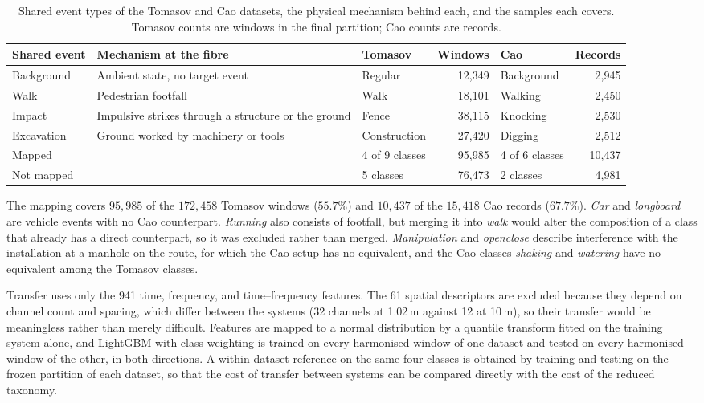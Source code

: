 \begin{table}[!htbp]
	\centering
	\caption{Shared event types of the Tomasov and Cao datasets, the physical mechanism behind each, and the samples each covers. Tomasov counts are windows in the final partition; Cao counts are records.}
	\label{tab:label_mapping}
	\small
	\setlength{\tabcolsep}{4pt}
	\begin{tabularx}{\textwidth}{@{}l >{\raggedright\arraybackslash}X l r l r@{}}
		\toprule
		\textbf{Shared event} & \textbf{Mechanism at the fibre} & \textbf{Tomasov} & \textbf{Windows} & \textbf{Cao} & \textbf{Records}\\
		\midrule
		Background  & Ambient state, no target event & Regular      & 12{,}349 & Background & 2{,}945\\
		Walk        & Pedestrian footfall & Walk         & 18{,}101 & Walking    & 2{,}450\\
		Impact      & Impulsive strikes through a structure or the ground & Fence        & 38{,}115 & Knocking   & 2{,}530\\
		Excavation  & Ground worked by machinery or tools & Construction & 27{,}420 & Digging    & 2{,}512\\
		\midrule
		Mapped      & & 4 of 9 classes & 95{,}985 & 4 of 6 classes & 10{,}437\\
		Not mapped  & & 5 classes      & 76{,}473 & 2 classes      & 4{,}981\\
		\bottomrule
	\end{tabularx}
\end{table}

The mapping covers $95{,}985$ of the $172{,}458$ Tomasov windows ($55.7\%$) and $10{,}437$ of the $15{,}418$ Cao records ($67.7\%$). \emph{Car} and \emph{longboard} are vehicle events with no Cao counterpart. \emph{Running} also consists of footfall, but merging it into \emph{walk} would alter the composition of a class that already has a direct counterpart, so it was excluded rather than merged. \emph{Manipulation} and \emph{openclose} describe interference with the installation at a manhole on the route, for which the Cao setup has no equivalent, and the Cao classes \emph{shaking} and \emph{watering} have no equivalent among the Tomasov classes.

Transfer uses only the 941 time, frequency, and time--frequency features. The 61 spatial descriptors are excluded because they depend on channel count and spacing, which differ between the systems (32 channels at 1.02\,m against 12 at 10\,m), so their transfer would be meaningless rather than merely difficult. Features are mapped to a normal distribution by a quantile transform fitted on the training system alone, and LightGBM with class weighting is trained on every harmonised window of one dataset and tested on every harmonised window of the other, in both directions. A within-dataset reference on the same four classes is obtained by training and testing on the frozen partition of each dataset, so that the cost of transfer between systems can be compared directly with the cost of the reduced taxonomy.

